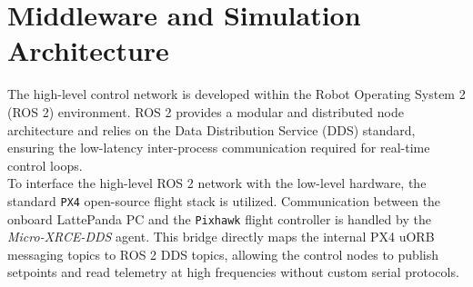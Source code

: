 \section{Middleware and Simulation Architecture}
The high-level control network is developed within the Robot Operating System 2 (ROS 2) environment. ROS 2 provides a modular and distributed node architecture and relies on the Data Distribution Service (DDS) standard, ensuring the low-latency inter-process communication required for real-time control loops.
\\To interface the high-level ROS 2 network with the low-level hardware, the standard \texttt{PX4} open-source flight stack is utilized. Communication between the onboard LattePanda PC and the \texttt{Pixhawk} flight controller is handled by the \textit{Micro-XRCE-DDS} agent. This bridge directly maps the internal PX4 uORB messaging topics to ROS 2 DDS topics, allowing the control nodes to publish setpoints and read telemetry at high frequencies without custom serial protocols.
